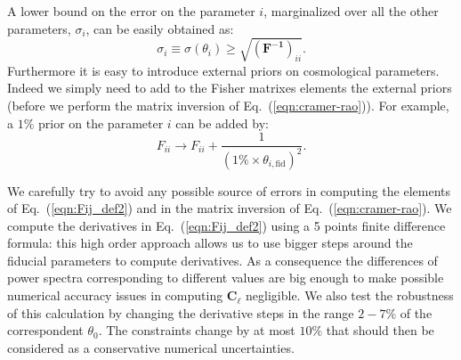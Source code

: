 \documentclass[aps,prd,reprint,superscriptaddress]{revtex4-1}
\newcommand\refeq[1]{Eq.~(\ref{eqn:#1})}
\begin{document}
A lower bound on the error on the parameter $i$, marginalized over all the other parameters, $\sigma_i$, can be easily obtained as:
\begin{equation}
\sigma_i \equiv \sigma (\theta_i) \geq \sqrt{(\mathbf{ F^{-1}})_{ii}}.
\label{eqn:cramer-rao}
\end{equation}
Furthermore it is easy to introduce external priors on cosmological parameters.
Indeed we simply need to add to the Fisher matrixes elements the external priors (before we perform the matrix inversion of \refeq{cramer-rao}).
For example, a $1\%$ prior on the parameter $i$ can be added by:
\begin{equation}
F_{ii} \rightarrow F_{ii} + \frac{1}{(1\% \times  \theta_{i,\text{fid}})^2}.
\end{equation}


We carefully try to avoid any possible source of errors in computing the elements of \refeq{Fij_def2} and in the matrix inversion of \refeq{cramer-rao}.
We compute the derivatives in \refeq{Fij_def2} using a 5 points finite difference formula:
this high order approach allows us to use bigger steps around the fiducial parameters to compute derivatives. As a consequence the differences of power spectra corresponding to different values are big enough to make possible numerical accuracy issues in computing $\boldsymbol{C}_\ell$ negligible.
We also test the robustness of this calculation by changing the derivative steps in the range $2-7\%$ of the correspondent $\theta_{0}$. The constraints change by at most $10\%$ that should then be considered as a conservative numerical uncertainties.
\end{document}
